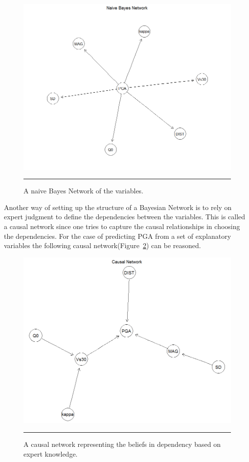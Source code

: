 \begin{figure}[!htpb]
	\centering
		\includegraphics[scale=0.45]{Figures/naive.png}
		\rule{35em}{0.5pt}
	\caption[Naive Bayes Network]{A naive Bayes Network of the variables.}
	\label{fig:naive}
\end{figure}
\newpage

Another way of setting up the structure of a Bayesian Network is to rely on expert judgment to define the dependencies between the variables. This is called a causal network since one tries to capture the causal relationships in choosing the dependencies. For the case of predicting PGA from a set of explanatory variables the following causal network(Figure~\ref{fig:causal}) can be reasoned. \\

\begin{figure}[!h]
	\centering
		\includegraphics[scale=0.45]{Figures/causal.png}
		\rule{35em}{0.5pt}
	\caption[Causal Network]{A causal network representing the beliefs in dependency based on expert knowledge.}
	\label{fig:causal}
\end{figure}

